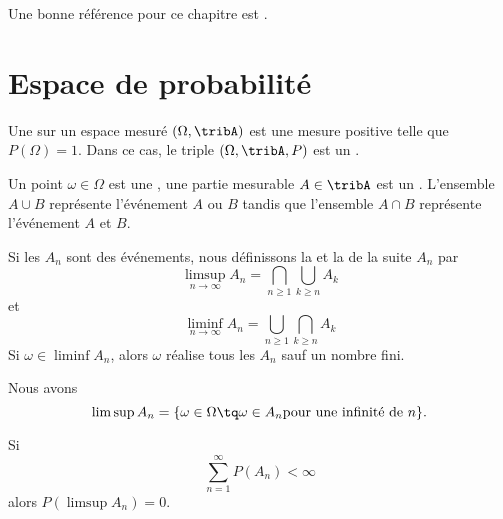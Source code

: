 
Une bonne référence pour ce chapitre est \cite{ProbaDanielLi}.

\section{Espace de probabilité}

Une  sur un espace mesuré \( (\Omega,\tribA)\) est une mesure positive telle que \( P(\Omega)=1\). Dans ce cas, le triple \( (\Omega,\tribA,P)\) est un .

Un point \( \omega\in\Omega\) est une , une partie mesurable \( A\in\tribA\) est un . L'ensemble \( A\cup B\) représente l'événement \( A\) ou \( B\) tandis que l'ensemble \( A\cap B\) représente l'événement \( A\) et \( B\).

Si les \( A_n\) sont des événements, nous définissons la  et la  de la suite \( A_n\) par
\begin{equation}
    \limsup_{n\to\infty}A_n=\bigcap_{n\geq 1}\bigcup_{k\geq n}A_k
\end{equation}
et
\begin{equation}
    \liminf_{n\to\infty}A_n=\bigcup_{n\geq 1}\bigcap_{k\geq n}A_k
\end{equation}
Si \( \omega\in\liminf A_n\), alors \( \omega\) réalise tous les \( A_n\) sauf un nombre fini.

Nous avons
\begin{equation}
    \limsup A_n=\{ \omega\in\Omega\tq \omega\in A_n\text{pour une infinité de \( n\)} \}.
\end{equation}

\begin{theorem}
    Si
    \begin{equation}
        \sum_{n=1}^{\infty}P(A_n)<\infty
    \end{equation}
    alors \( P(\limsup A_n)=0\).
\end{theorem}

